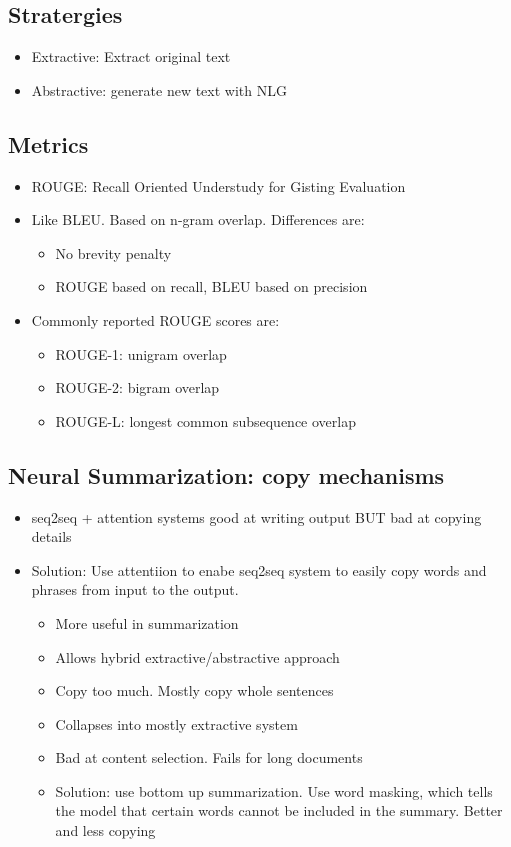 \documentclass[a4paper]{article}
\begin{document}
\subsection{Stratergies}
\begin{itemize}
    \item Extractive: Extract original text
    \item Abstractive: generate new text with NLG
\end{itemize}
\subsection{Metrics}
\begin{itemize}
    \item ROUGE: Recall Oriented Understudy for Gisting Evaluation
    \item Like BLEU. Based on n-gram overlap. Differences are:
    \begin{itemize}
        \item No brevity penalty
        \item ROUGE based on recall, BLEU based on precision
    \end{itemize}
    \item Commonly reported ROUGE scores are:
    \begin{itemize}
        \item ROUGE-1: unigram overlap
        \item ROUGE-2: bigram overlap
        \item ROUGE-L: longest common subsequence overlap
    \end{itemize}
\end{itemize}
\subsection{Neural Summarization: copy mechanisms}
\begin{itemize}
    \item seq2seq + attention systems good at writing output BUT bad at copying details
    \item Solution: Use attentiion to enabe seq2seq system to easily copy words and phrases from input to the output.
    \begin{itemize}
        \item More useful in summarization
        \item Allows hybrid extractive/abstractive approach
    \end{itemize}
    \begin{itemize}
        \item Copy too much. Mostly copy whole sentences
        \item Collapses into mostly extractive system
        \item Bad at content selection. Fails for long documents
        \item Solution: use bottom up summarization. Use word masking, which tells the model that certain words cannot be included in the summary. Better and less copying
    \end{itemize}
\end{itemize}
\end{document}
